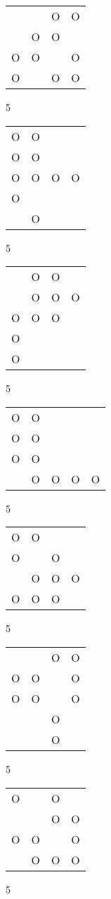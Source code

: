 \begin{tabular}{|m{0.2cm}m{0.2cm}m{0.2cm}m{0.2cm}|}\hline
 & &O&O\\
 &O&O& \\
O&O& &O\\
O& &O&O\\
\hline\end{tabular}5
\begin{tabular}{|m{0.2cm}m{0.2cm}m{0.2cm}m{0.2cm}|}\hline
O&O& & \\
O&O& & \\
O&O&O&O\\
O& & & \\
 &O& & \\
\hline\end{tabular}5
\begin{tabular}{|m{0.2cm}m{0.2cm}m{0.2cm}m{0.2cm}|}\hline
 &O&O& \\
 &O&O&O\\
O&O&O& \\
O& & & \\
O& & & \\
\hline\end{tabular}5
\begin{tabular}{|m{0.2cm}m{0.2cm}m{0.2cm}m{0.2cm}m{0.2cm}|}\hline
O&O& & & \\
O&O& & & \\
O&O& & & \\
 &O&O&O&O\\
\hline\end{tabular}5
\begin{tabular}{|m{0.2cm}m{0.2cm}m{0.2cm}m{0.2cm}|}\hline
O&O& & \\
O& &O& \\
 &O&O&O\\
O&O&O& \\
\hline\end{tabular}5
\begin{tabular}{|m{0.2cm}m{0.2cm}m{0.2cm}m{0.2cm}|}\hline
 & &O&O\\
O&O& &O\\
O&O& &O\\
 & &O& \\
 & &O& \\
\hline\end{tabular}5
\begin{tabular}{|m{0.2cm}m{0.2cm}m{0.2cm}m{0.2cm}|}\hline
O& &O& \\
 & &O&O\\
O&O& &O\\
 &O&O&O\\
\hline\end{tabular}5
